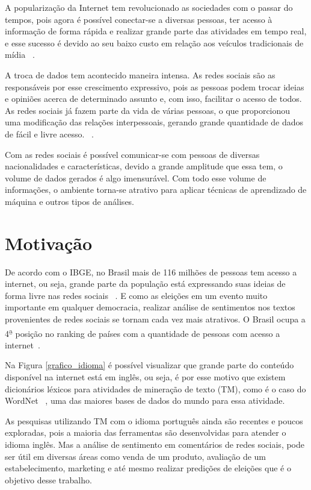 A popularização da Internet tem revolucionado as sociedades com o passar do tempos,
pois agora é possível conectar-se a diversas pessoas, ter acesso à informação de forma rápida
e realizar grande parte das atividades  em tempo real, e esse sucesso é devido ao seu baixo custo
em relação aos veículos tradicionais de mídia ~\cite{song2014analyzing}. 

A troca de dados tem acontecido maneira intensa. As redes sociais são as responsáveis por esse crescimento
expressivo, pois as pessoas podem trocar ideias e opiniões acerca de determinado assunto e, com isso, facilitar
o acesso de todos. As redes sociais já fazem parte da vida de várias pessoas, 
o que proporcionou uma modificação das relações interpessoais, gerando grande quantidade de dados de fácil e livre acesso. ~\cite{5194581}.

Com as redes sociais é possível comunicar-se com pessoas de diversas nacionalidades e características, devido
a grande amplitude que essa tem, o volume de dados gerados é algo imensurável. 
Com todo esse volume de informações, o ambiente torna-se atrativo para aplicar técnicas de aprendizado de
máquina e outros tipos de análises.
\section{Motivação}

De acordo com o \acrshort{IBGE}, no Brasil mais de 116 milhões de pessoas tem acesso a internet, ou seja, grande parte da população está expressando suas ideias
de forma livre nas redes sociais ~\cite{notibge}. E como as eleições em um evento muito importante em qualquer democracia, realizar análise de sentimentos nos textos 
provenientes de redes sociais se tornam cada vez mais atrativos. O Brasil ocupa a 4\textsuperscript{\b{a}} posição no ranking de países com a quantidade de pessoas com acesso a internet~\cite{ILS}.

Na Figura \ref{grafico_idioma} é possível visualizar que grande parte do conteúdo disponível na internet está em inglês, ou seja, é por esse motivo que
existem dicionários léxicos para atividades de mineração de texto (\acrshort{TM}), como é o caso do WordNet ~\cite{miller1995wordnet}, uma das maiores bases de dados do mundo para essa atividade. 

As pesquisas utilizando \acrshort{TM} com o idioma português ainda são recentes e poucos exploradas, pois a maioria das ferramentas são desenvolvidas para atender o idioma inglês. Mas a análise
de sentimento em comentários de redes sociais, pode ser útil em diversas áreas como venda de um produto, avaliação de um estabelecimento, marketing e até mesmo realizar predições de eleições que é o objetivo desse trabalho.


